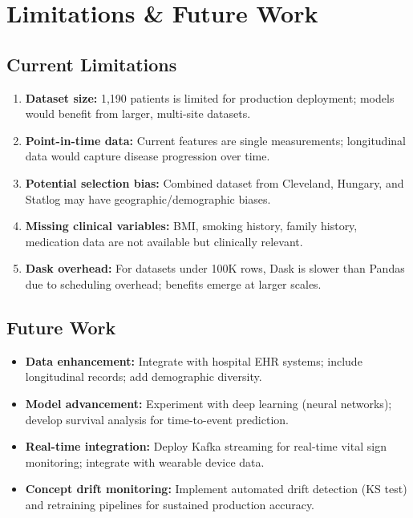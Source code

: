 \documentclass[12pt,a4paper]{article}
\begin{document}
\section{Limitations \& Future Work}

\subsection{Current Limitations}

\begin{enumerate}
    \item \textbf{Dataset size:} 1,190 patients is limited for production deployment; models would benefit from larger, multi-site datasets.
    \item \textbf{Point-in-time data:} Current features are single measurements; longitudinal data would capture disease progression over time.
    \item \textbf{Potential selection bias:} Combined dataset from Cleveland, Hungary, and Statlog may have geographic/demographic biases.
    \item \textbf{Missing clinical variables:} BMI, smoking history, family history, medication data are not available but clinically relevant.
    \item \textbf{Dask overhead:} For datasets under 100K rows, Dask is slower than Pandas due to scheduling overhead; benefits emerge at larger scales.
\end{enumerate}

\subsection{Future Work}

\begin{itemize}
    \item \textbf{Data enhancement:} Integrate with hospital EHR systems; include longitudinal records; add demographic diversity.
    \item \textbf{Model advancement:} Experiment with deep learning (neural networks); develop survival analysis for time-to-event prediction.
    \item \textbf{Real-time integration:} Deploy Kafka streaming for real-time vital sign monitoring; integrate with wearable device data.
    \item \textbf{Concept drift monitoring:} Implement automated drift detection (KS test) and retraining pipelines for sustained production accuracy.
\end{itemize}
\end{document}
